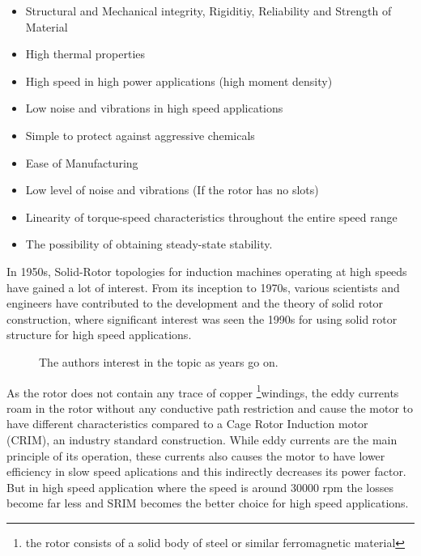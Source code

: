 \begin{itemize}[itemsep=0pt]
\item Structural and Mechanical integrity, Rigiditiy, Reliability and Strength of
  Material
\item High thermal properties
\item High speed in high power applications (high moment density)
\item Low noise and vibrations in high speed applications
\item Simple to protect against aggressive chemicals
\item Ease of Manufacturing
\item Low level of noise and vibrations (If the rotor has no slots)
\item Linearity of torque-speed characteristics throughout the entire speed range
\item The possibility of obtaining steady-state stability.
\end{itemize}

In 1950s, Solid-Rotor topologies for induction machines operating at high speeds
have gained a lot of interest. From its inception to 1970s, various scientists and engineers
have contributed to the development and the theory of solid rotor construction, where significant
interest was seen the 1990s for using solid rotor structure for high speed applications.

\begin{figure}[!t]
  \caption{The authors interest in the topic as years go on.}
\end{figure}

As the rotor does not contain any trace of copper \footnote{the rotor
  consists of a solid body of steel or similar ferromagnetic material}{windings}, the eddy currents
roam in the rotor without any conductive path restriction and cause the motor to
have different characteristics compared to a Cage Rotor Induction motor (CRIM), an industry standard
construction.
While eddy currents are the main principle of its operation, these currents also causes
the motor to have lower efficiency in slow speed aplications and this indirectly
decreases its power factor. But in high speed application where the speed is
around 30000 rpm the losses become far less and SRIM becomes the better choice for high speed
applications.

